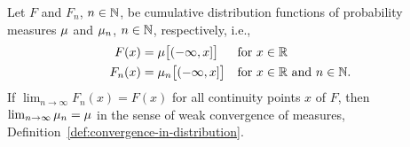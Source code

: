 \begin{theorem}
  \label{thm:convergence-in-distribution-with-cdf}
  Let $F$ and $F_n$, $n \in \mathbb{N}$, be cumulative distribution functions of
  probability measures $\mu$ and $\mu_n$, $n \in \mathbb{N}$, respectively, i.e.,
  \begin{align*}
      F(x) = \; & \mu \big[(-\infty,x]\big] & & \text{for $x \in \mathbb{R}$} \\
      F_n(x) = \; & \mu_n \big[(-\infty,x]\big] & & \text{for $x \in \mathbb{R}$ and $n \in \mathbb{N}$.}
  \end{align*}
  If $\lim_{n \to \infty} F_n(x) = F(x)$ for all continuity points $x$ of $F$,
  then $\lim_{n \to \infty} \mu_n = \mu$ in the sense of weak convergence
  of measures, Definition~\ref{def:convergence-in-distribution}.
\end{theorem}
